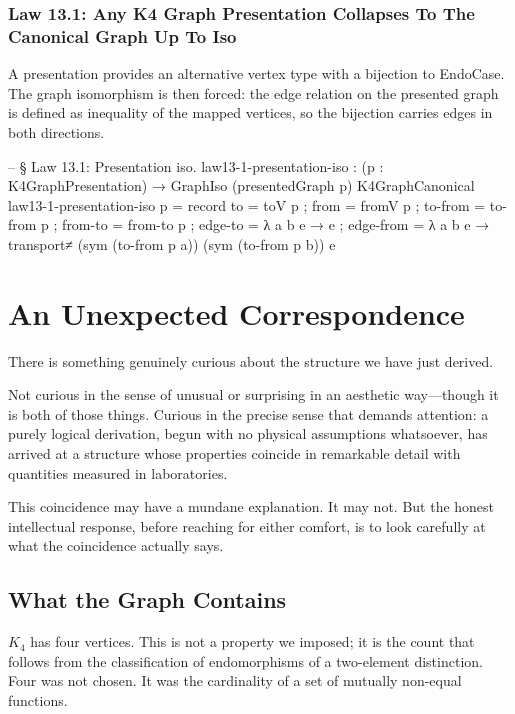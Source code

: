 \documentclass[11pt,a4paper]{book}
\def\texttt#1{#1}%
\def\texorpdfstring#1#2{#2}%
\begin{document}
\subsection{Law 13.1: Any K\texorpdfstring{$_4$}{4} Graph Presentation Collapses To The Canonical Graph Up To Iso}

A presentation provides an alternative vertex type with a bijection to \texttt{EndoCase}.
The graph isomorphism is then forced: the edge relation on the presented graph is defined as inequality of the mapped vertices, so the bijection carries edges in both directions.

\begin{code}
-- § Law 13.1: Presentation iso.
law13-1-presentation-iso : (p : K4GraphPresentation) → GraphIso (presentedGraph p) K4GraphCanonical
law13-1-presentation-iso p = record
  { to = toV p
  ; from = fromV p
  ; to-from = to-from p
  ; from-to = from-to p
  ; edge-to = λ {a} {b} e → e
  ; edge-from = λ {a} {b} e →
      transport≠ (sym (to-from p a)) (sym (to-from p b)) e
  }
\end{code}

\chapter{An Unexpected Correspondence}

There is something genuinely curious about the structure we have just derived.

Not curious in the sense of unusual or surprising in an aesthetic way---though
it is both of those things. Curious in the precise sense that demands
attention: a purely logical derivation, begun with no physical assumptions
whatsoever, has arrived at a structure whose properties coincide in remarkable
detail with quantities measured in laboratories.

This coincidence may have a mundane explanation. It may not. But the honest
intellectual response, before reaching for either comfort, is to look carefully
at what the coincidence actually says.

\section{What the Graph Contains}

$K_4$ has four vertices. This is not a property we imposed; it is the count that
follows from the classification of endomorphisms of a two-element distinction. Four
was not chosen. It was the cardinality of a set of mutually non-equal functions.
\end{document}
